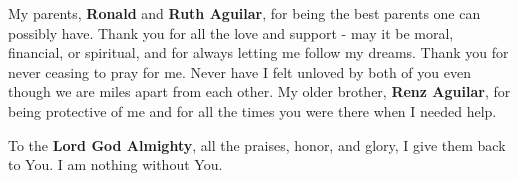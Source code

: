 My parents, \textbf{Ronald} and \textbf{Ruth Aguilar}, for being the best parents one can possibly have. Thank you for all the love and support - may it be moral, financial, or spiritual, and for always letting me follow my dreams. Thank you for never ceasing to pray for me. Never have I felt unloved by both of you even though we are miles apart from each other. My older brother, \textbf{Renz Aguilar}, for being protective of me and for all the times you were there when I needed help.

To the \textbf{Lord God Almighty}, all the praises, honor, and glory, I give them back to You. I am nothing without You.







%
